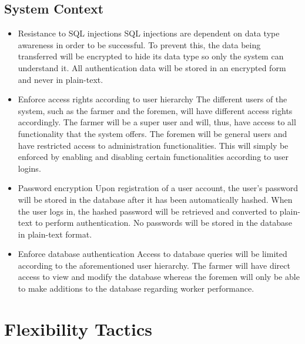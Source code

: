 \documentclass[11pt,fleqn]{book} %
\begin{document}
	\subsection{System Context}
		\begin{itemize}
			\item Resistance to SQL injections\newline\newline
			SQL injections are dependent on data type awareness in order to be successful. To prevent this, the data being transferred will be encrypted to hide its data type so only the system can understand it. All authentication data will be stored in an encrypted form and never in plain-text.\newline
			
			\item Enforce access rights according to user hierarchy \newline\newline
			The different users of the system, such as the farmer and the foremen, will have different access rights accordingly. The farmer will be a super user and will, thus, have access to all functionality that the system offers. The foremen will be general users and have restricted access to administration functionalities. This will simply be enforced by enabling and disabling certain functionalities according to user logins.\newline
			
			\item Password encryption\newline\newline
			Upon registration of a user account, the user’s password will be stored in the database after it has been automatically hashed. When the user logs in, the hashed password will be retrieved and converted to plain-text to perform authentication. No passwords will be stored in the database in plain-text format.\newline
			
			\item Enforce database authentication\newline\newline
			Access to database queries will be limited according to the aforementioned user hierarchy. The farmer will have direct access to view and modify the database whereas the foremen will only be able to make additions to the database regarding worker performance.			
		\end{itemize}
\section{Flexibility Tactics}
\end{document}
